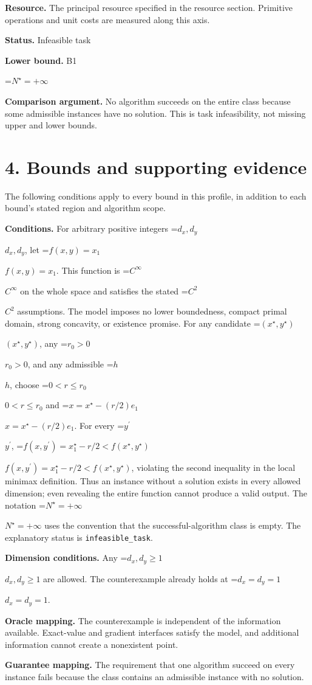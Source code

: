 \documentclass[10pt,a4paper]{article}
\newcommand{\AtlasMath}[1]{\par\begingroup\centering\setbox0=\hbox{$\displaystyle #1$}\ifdim\wd0>1.4\linewidth\typeout{ATLAS WIDE FORMULA: \the\wd0}\fi\ifdim\wd0>\linewidth\resizebox{\linewidth}{!}{\box0}\else\box0\fi\par\endgroup}
\newcommand{\AtlasInlineMath}[1]{\begingroup\setbox0=\hbox{$#1$}\ifdim\wd0>.4\linewidth\endgroup\AtlasMath{#1}\else\endgroup$#1$\fi}
\begin{document}
\textbf{Resource.} The principal resource specified in the resource section. Primitive operations and unit costs are measured along this axis.

\textbf{Status.} Infeasible task

\textbf{Lower bound.} B1

\AtlasMath{N^\star=+\infty}
\textbf{Comparison argument.} No algorithm succeeds on the entire class because some admissible instances have no solution. This is task infeasibility, not missing upper and lower bounds.

\section{4. Bounds and supporting evidence}
The following conditions apply to every bound in this profile, in addition to each bound's stated region and algorithm scope.

\textbf{Conditions.} For arbitrary positive integers \AtlasInlineMath{d_x,d_y}, let \AtlasInlineMath{f(x,y)=x_1}. This function is \AtlasInlineMath{C^\infty} on the whole space and satisfies the stated \AtlasInlineMath{C^2} assumptions. The model imposes no lower boundedness, compact primal domain, strong concavity, or existence promise. For any candidate \AtlasInlineMath{(x^\star,y^\star)}, any \AtlasInlineMath{r_0>0}, and any admissible \AtlasInlineMath{h}, choose \AtlasInlineMath{0<r\le r_0} and \AtlasInlineMath{x=x^\star-(r/2)e_1}. For every \AtlasInlineMath{y^\prime}, \AtlasInlineMath{f(x,y^\prime)=x_1^\star-r/2<f(x^\star,y^\star)}, violating the second inequality in the local minimax definition. Thus an instance without a solution exists in every allowed dimension; even revealing the entire function cannot produce a valid output. The notation \AtlasInlineMath{N^\star=+\infty} uses the convention that the successful-algorithm class is empty. The explanatory status is \texttt{infeasible\_\allowbreak{}task}.

\textbf{Dimension conditions.} Any \AtlasInlineMath{d_x,d_y\ge1} are allowed. The counterexample already holds at \AtlasInlineMath{d_x=d_y=1}.

\textbf{Oracle mapping.} The counterexample is independent of the information available. Exact-value and gradient interfaces satisfy the model, and additional information cannot create a nonexistent point.

\textbf{Guarantee mapping.} The requirement that one algorithm succeed on every instance fails because the class contains an admissible instance with no solution.
\end{document}
